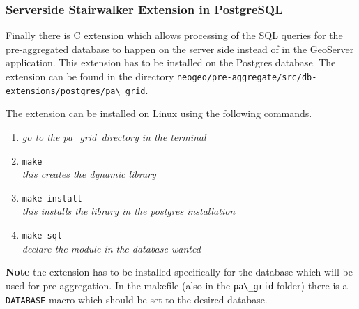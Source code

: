 \subsubsection{Serverside Stairwalker Extension in PostgreSQL}
Finally there is C extension which allows processing of the SQL queries for the pre-aggregated database to happen on the server side instead of in the GeoServer application. This extension has to be installed on the Postgres database. The extension can be found in the directory \lstinline$neogeo/pre-aggregate/src/db-extensions/postgres/pa\_grid$.

The extension can be installed on Linux using the following commands.

\begin{enumerate}
	\item \textit{go to the pa\_grid\ directory in the terminal}
	\item \lstinline$make$ \\ \textit{this creates the dynamic library}
	\item \lstinline$make install$ \\ \textit{this installs the library in the postgres installation}
	\item \lstinline$make sql$ \\ \textit{declare the module in the database wanted}
\end{enumerate}

\noindent\textbf{Note} the extension has to be installed specifically for the database which will be used for pre-aggregation. In the makefile (also in the \lstinline$pa\_grid$ folder) there is a \lstinline$DATABASE$ macro which should be set to the desired database.

